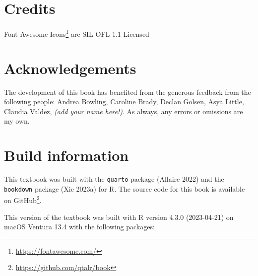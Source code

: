 \documentclass[
  letterpaper,
]{latex/krantz}
\DeclareRobustCommand{\href}[2]{#2\footnote{\url{#1}}}
\begin{document}
\hypertarget{credits}{%
\section*{Credits}\label{credits}}


\href{https://fontawesome.com/}{Font Awesome Icons} are SIL OFL 1.1
Licensed

\hypertarget{acknowledgements}{%
\section*{Acknowledgements}\label{acknowledgements}}


The development of this book has benefited from the generous feedback
from the following people: Andrea Bowling, Caroline Brady, Declan
Golsen, Asya Little, Claudia Valdez, \emph{(add your name here!)}. As
always, any errors or omissions are my own.

\hypertarget{build-information}{%
\section*{Build information}\label{build-information}}


This textbook was built with the \texttt{quarto} package (Allaire 2022)
and the \texttt{bookdown} package (Xie 2023a) for R. The source code for
this book is available on \href{https://github.com/qtalr/book}{GitHub}.

This version of the textbook was built with R version 4.3.0 (2023-04-21)
on macOS Ventura 13.4 with the following packages:
\end{document}
